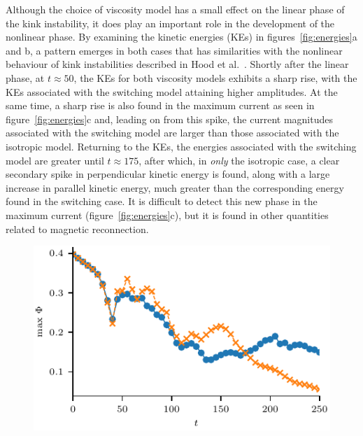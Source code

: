 Although the choice of viscosity model has a small effect on the
linear phase of the kink instability, it does play an important role
in the development of the nonlinear phase. By examining the kinetic
energies (KEs) in figures~\ref{fig:energies}a and b, a pattern
emerges in both cases that has similarities with the nonlinear
  behaviour of kink instabilities described in Hood et
al.~\cite{hoodCoronalHeatingMagnetic2009}. Shortly after the linear
phase, at $t\approx50$, the KEs for both viscosity models
exhibits a sharp rise, with the KEs associated with the switching
model attaining higher amplitudes. At the same time, a sharp rise is
also found in the maximum current as seen in
figure~\ref{fig:energies}c and, leading on from this spike, the
current magnitudes associated with the switching model are larger than
those associated with the isotropic model. Returning to the KEs, the
energies associated with the switching model are greater until
$t\approx175$, after which, in \emph{only} the isotropic case, 
a clear secondary spike in perpendicular kinetic energy is found, along with a large
increase in parallel kinetic energy, much greater than the corresponding energy
found in the switching case. It is difficult to detect this new phase
in the maximum current (figure~\ref{fig:energies}c), but it is found
in other quantities related to magnetic reconnection. 

\begin{figure}[t]
    \centering
      \centering
      \includegraphics[width=0.5\linewidth]{max_parallel_electric_field.pdf}
    ~
    \label{fig:reconnection-rates}
\end{figure}

